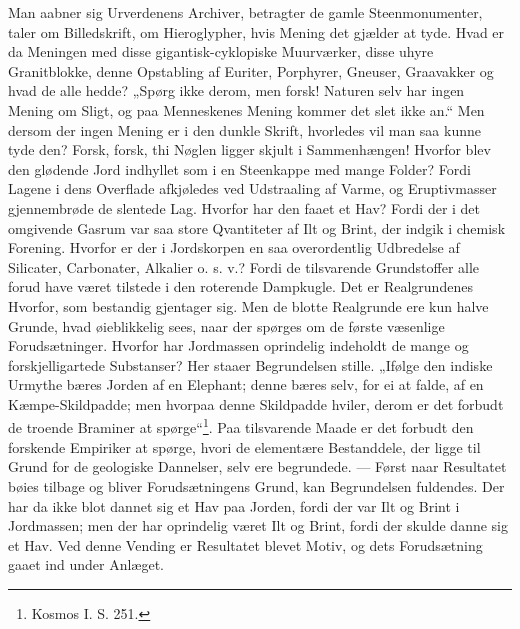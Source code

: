 \documentclass[12pt,a4paper]{book}
\begin{document}
Man aabner sig Urverdenens Archiver, betragter de gamle Steenmonumenter, taler
om Billedskrift, om Hieroglypher, hvis Mening det gjælder at tyde. Hvad er da
Meningen med disse gigantisk-cyklopiske Muurværker, disse uhyre Granitblokke,
denne Opstabling af Euriter, Porphyrer, Gneuser, Graavakker og hvad de alle
hedde? „Spørg ikke derom, men forsk! Naturen selv har ingen Mening om Sligt,
og paa Menneskenes Mening kommer det slet ikke an.“ Men dersom der ingen
Mening er i den dunkle Skrift, hvorledes vil man saa kunne tyde den? Forsk,
forsk, thi Nøglen ligger skjult i Sammenhængen! Hvorfor blev den glødende Jord
indhyllet som i en Steenkappe med mange Folder? Fordi Lagene i dens Overflade
afkjøledes ved Udstraaling af Varme, og Eruptivmasser gjennembrøde de slentede
Lag. Hvorfor har den faaet et Hav? Fordi der i det omgivende Gasrum var saa
store Qvantiteter af Ilt og Brint, der indgik i chemisk Forening. Hvorfor er
der i Jordskorpen en saa
overordentlig Udbredelse af Silicater, Carbonater, Alkalier o. s. v.? Fordi de
tilsvarende Grundstoffer alle forud have været tilstede i den roterende
Dampkugle. Det er Realgrundenes Hvorfor, som bestandig gjentager sig. Men de
blotte Realgrunde ere kun halve Grunde, hvad øieblikkelig sees, naar der
spørges om de første væsenlige Forudsætninger. Hvorfor har Jordmassen
oprindelig indeholdt de mange og forskjelligartede Substanser? Her staaer
Begrundelsen stille. „Ifølge den indiske Urmythe bæres Jorden af en Elephant;
denne bæres selv, for ei at falde, af en Kæmpe-Skildpadde; men hvorpaa denne
Skildpadde hviler, derom er det forbudt de troende Braminer at
spørge“\footnote{%
Kosmos I. S. 251.}. Paa tilsvarende Maade er det forbudt den forskende
Empiriker at spørge, hvori de elementære Bestanddele, der ligge til Grund for
de geologiske Dannelser, selv ere begrundede. --- Først naar Resultatet bøies
tilbage og bliver Forudsætningens Grund, kan Begrundelsen fuldendes. Der har
da ikke blot dannet sig et Hav paa Jorden, fordi der var Ilt og Brint i
Jordmassen; men der har oprindelig været Ilt og Brint, fordi der skulde danne
sig et Hav. Ved denne Vending er Resultatet blevet Motiv, og dets
Forudsætning gaaet ind under Anlæget.
\end{document}
